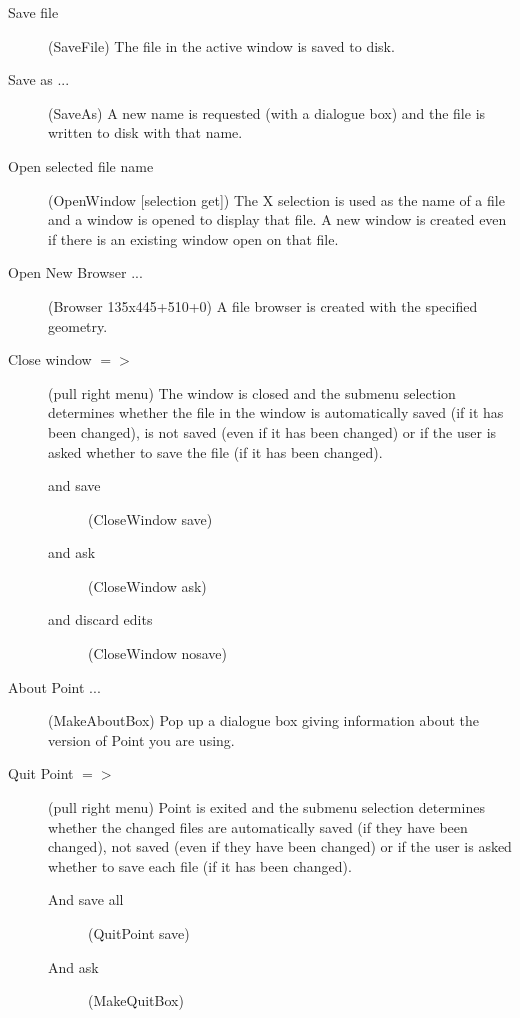 \begin{description}
\begin{description}
	\item[Save file] (SaveFile)
	The file in the active window is saved to disk.

	\item[Save as ...] (SaveAs)
	A new name is requested (with a dialogue box)
	and the file is written to disk with that name.

	\item[Open selected file name] (OpenWindow [selection get])
	The X selection is used as the name of a file 
	and a window is opened to display that file.
	A new window is created even if there is an existing
	window open on that file.

	\item[Open New Browser ...] (Browser 135x445+510+0)
	A file browser is created with the specified geometry.

	\item[Close window $=>$] (pull right menu)
	The window is closed and the submenu selection determines
	whether the file in the window is automatically saved
	(if it has been changed), is not saved (even if it has
	been changed) or if the user is asked whether to save
	the file (if it has been changed).
	\begin{description}

		\item[and save] (CloseWindow save)

		\item[and ask] (CloseWindow ask)

		\item[and discard edits] (CloseWindow nosave)

	\end{description}

	\item[About Point ...] (MakeAboutBox)
	Pop up a dialogue box giving information about
	the version of Point you are using.

	\item[Quit Point $=>$] (pull right menu)
	Point is exited and the submenu selection determines
	whether the changed files are automatically saved
	(if they have been changed), not saved (even if they have
	been changed) or if the user is asked whether to save
	each file (if it has been changed).
	\begin{description}

		\item[And save all] (QuitPoint save)

		\item[And ask] (MakeQuitBox)


\end{description}
\end{description}
\end{description}

